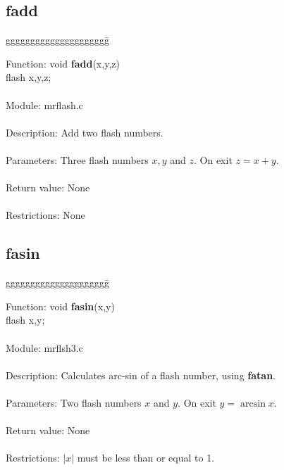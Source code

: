 \subsection{fadd}

\begin{tabbing}
ggggggggggggggggggggg\= \kill

      Function:      \>void {\bf fadd}(x,y,z) \\
                     \>flash x,y,z; \\
      \ \\
      Module:        \>mrflash.c \\
      \ \\
      Description:   \>Add two flash numbers. \\
      \ \\
      Parameters:    \>Three flash numbers $x, y$ and $z$. On exit $z=x+y$. \\
      \ \\
      Return value:  \>None \\
      \ \\
      Restrictions:  \>None \\

\end{tabbing}

\subsection{fasin}

\begin{tabbing}
ggggggggggggggggggggg\= \kill


      Function:      \>void {\bf fasin}(x,y) \\
                     \>flash x,y; \\
      \ \\
      Module:        \>mrflsh3.c \\
      \ \\
      Description:   \>Calculates arc-sin of a flash number, using {\bf fatan}. \\
      \ \\
      Parameters:    \>Two flash numbers $x$ and $y$. On exit $y=\arcsin x$. \\
      \ \\
      Return value:  \>None \\
      \ \\
      Restrictions:  \>$|x|$ must be less than or equal to 1. \\

\end{tabbing}
\pagebreak
